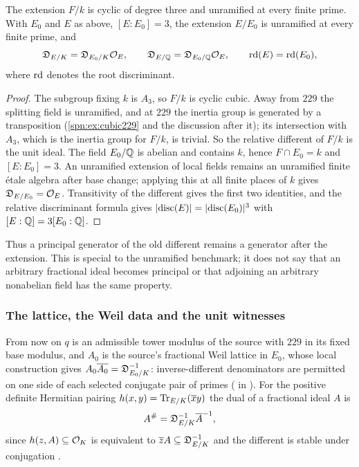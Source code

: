 \begin{theorem}\label{grp:thm:unramified}
The extension $F/k$ is cyclic of degree three and unramified at every finite
prime. With $E_0$ and $E$ as above, $[E:E_0]=3$, the extension $E/E_0$ is
unramified at every finite prime, and
\begin{equation}\label{grp:eq:different}
 \mathfrak{D}_{E/K}=\mathfrak{D}_{E_0/K}\mathcal{O}_E,\qquad
 \mathfrak{D}_{E/\mathbb{Q}}=\mathfrak{D}_{E_0/\mathbb{Q}}\mathcal{O}_E,\qquad
 \operatorname{rd}(E)=\operatorname{rd}(E_0),
\end{equation}
where $\operatorname{rd}$ denotes the root discriminant.
\end{theorem}

\begin{proof}
The subgroup fixing $k$ is $A_3$, so $F/k$ is cyclic cubic. Away from $229$
the splitting field is unramified, and at $229$ the inertia group is generated by a
transposition (\cref{spn:ex:cubic229} and the discussion after it); its intersection with $A_3$, which is the
inertia group for $F/k$, is trivial. So the relative different of $F/k$ is the
unit ideal. The field $E_0/\mathbb{Q}$ is abelian and contains $k$, hence
$F\cap E_0=k$ and $[E:E_0]=3$. An unramified extension of local fields remains
an unramified finite \'etale algebra after base change; applying this at all
finite places of $k$ gives $\mathfrak{D}_{E/E_0}=\mathcal{O}_E$. Transitivity of the
different gives the first two identities, and the relative discriminant
formula gives $\lvert\operatorname{disc}(E)\rvert=\lvert\operatorname{disc}(E_0)\rvert^3$ with $[E:\mathbb{Q}]=3[E_0:\mathbb{Q}]$.
\end{proof}

Thus a principal generator of the old different remains a generator after the
extension. This is special to the unramified benchmark; it does not say that
an arbitrary fractional ideal becomes principal or that adjoining an arbitrary
nonabelian field has the same property.

\subsubsection{The lattice, the Weil data and the unit witnesses}
From now on $q$ is an admissible tower modulus of the source with $229$ in its
fixed base modulus, and $A_0$ is the source's fractional Weil lattice in
$E_0$, whose local construction gives
$A_0\overline{A_0}=\mathfrak{D}_{E_0/K}^{-1}$: inverse-different denominators are
permitted on one side of each selected conjugate pair of primes
( in ).
For the positive definite Hermitian pairing
$h(x,y)=\operatorname{Tr}_{E/K}(\overline xy)$ the dual of a fractional ideal $A$ is
\begin{equation}\label{grp:eq:hdual}
 A^\#=\mathfrak{D}_{E/K}^{-1}\overline A^{-1},
\end{equation}
since $h(z,A)\subseteq\mathcal{O}_K$ is equivalent to
$\overline zA\subseteq\mathfrak{D}_{E/K}^{-1}$ and the different is stable under
conjugation \cite{Milne2020Algebraic}.

